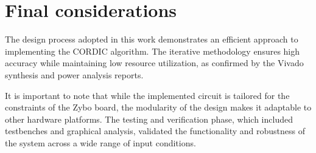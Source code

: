 \chapter{Final considerations}
The design process adopted in this work demonstrates an efficient approach to implementing the CORDIC algorithm. The iterative methodology ensures high accuracy while maintaining low resource utilization, as confirmed by the Vivado synthesis and power analysis reports. 

It is important to note that while the implemented circuit is tailored for the constraints of the Zybo board, the modularity of the design makes it adaptable to other hardware platforms. The testing and verification phase, which included testbenches and graphical analysis, validated the functionality and robustness of the system across a wide range of input conditions.